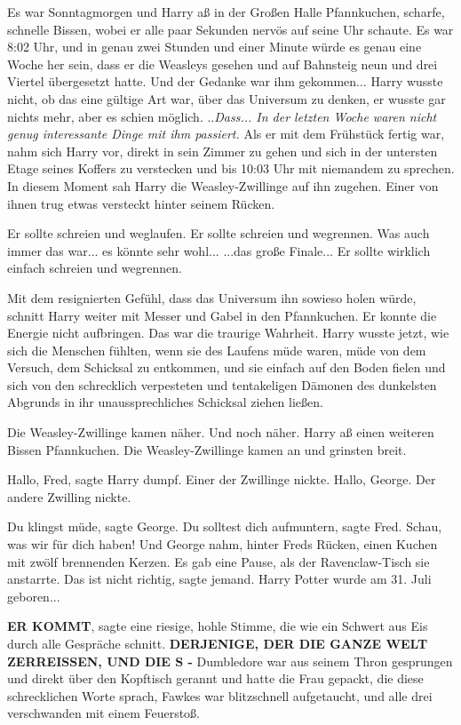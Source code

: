 Es war Sonntagmorgen und Harry aß in der Großen Halle Pfannkuchen, scharfe,
schnelle Bissen, wobei er alle paar Sekunden nervös auf seine Uhr schaute. Es
war 8:02 Uhr, und in genau zwei Stunden und einer Minute würde es genau eine
Woche her sein, dass er die Weasleys gesehen und auf Bahnsteig neun und drei
Viertel übergesetzt hatte. Und der Gedanke war ihm gekommen... Harry wusste
nicht, ob das eine gültige Art war, über das Universum zu denken, er wusste gar
nichts mehr, aber es schien möglich. ..\emph{Dass... In der letzten Woche waren
nicht genug interessante Dinge mit ihm passiert.} Als er mit dem Frühstück
fertig war, nahm sich Harry vor, direkt in sein Zimmer zu gehen und sich in der
untersten Etage seines Koffers zu verstecken und bis 10:03 Uhr mit niemandem zu
sprechen. In diesem Moment sah Harry die Weasley-Zwillinge auf ihn zugehen.
Einer von ihnen trug etwas versteckt hinter seinem Rücken.

Er sollte schreien und weglaufen. Er sollte schreien und wegrennen. Was auch
immer das war... es könnte sehr wohl... ...das große Finale... Er sollte
wirklich einfach schreien und wegrennen.

Mit dem resignierten Gefühl, dass das Universum ihn sowieso holen würde, schnitt
Harry weiter mit Messer und Gabel in den Pfannkuchen. Er konnte die Energie
nicht aufbringen. Das war die traurige Wahrheit. Harry wusste jetzt, wie sich
die Menschen fühlten, wenn sie des Laufens müde waren, müde von dem Versuch, dem
Schicksal zu entkommen, und sie einfach auf den Boden fielen und sich von den
schrecklich verpesteten und tentakeligen Dämonen des dunkelsten Abgrunds in ihr
unaussprechliches Schicksal ziehen ließen.

Die Weasley-Zwillinge kamen näher. Und noch näher. Harry aß einen weiteren
Bissen Pfannkuchen. Die Weasley-Zwillinge kamen an und grinsten breit.

\glqq Hallo, Fred\grqq{}, sagte Harry dumpf. Einer der Zwillinge nickte. \glqq
Hallo, George.\grqq{} Der andere Zwilling nickte.

\glqq Du klingst müde\grqq{}, sagte George. \glqq Du solltest dich
aufmuntern\grqq{}, sagte Fred. \glqq Schau, was wir für dich haben!\grqq{} Und
George nahm, hinter Freds Rücken, einen Kuchen mit zwölf brennenden Kerzen. Es
gab eine Pause, als der Ravenclaw-Tisch sie anstarrte. \glqq Das ist nicht
richtig\grqq{}, sagte jemand. \glqq Harry Potter wurde am 31. Juli
geboren...\grqq{}

\textbf{\glqq ER KOMMT\grqq{}}, sagte eine riesige, hohle Stimme, die wie ein
Schwert aus Eis durch alle Gespräche schnitt. \textbf{ \glqq DERJENIGE, DER DIE
GANZE WELT ZERREISSEN, UND DIE S -\grqq{} } Dumbledore war aus seinem Thron
gesprungen und direkt über den Kopftisch gerannt und hatte die Frau gepackt, die
diese schrecklichen Worte sprach, Fawkes war blitzschnell aufgetaucht, und alle
drei verschwanden mit einem Feuerstoß.

